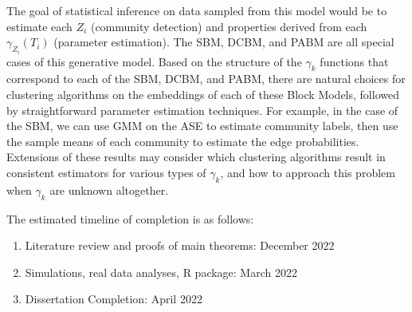 \documentclass[
  11pt,
]{article}
\begin{document}
The goal of statistical inference on data sampled from this model would
be to estimate each \(Z_i\) (community detection) and properties derived
from each \(\gamma_{Z_i}(T_i)\) (parameter estimation). The SBM, DCBM,
and PABM are all special cases of this generative model. Based on the
structure of the \(\gamma_k\) functions that correspond to each of the
SBM, DCBM, and PABM, there are natural choices for clustering algorithms
on the embeddings of each of these Block Models, followed by
straightforward parameter estimation techniques. For example, in the
case of the SBM, we can use GMM on the ASE to estimate community labels,
then use the sample means of each community to estimate the edge
probabilities. Extensions of these results may consider which clustering
algorithms result in consistent estimators for various types of
\(\gamma_k\), and how to approach this problem when \(\gamma_k\) are
unknown altogether.

The estimated timeline of completion is as follows:

\begin{enumerate}
\def\labelenumi{\arabic{enumi}.}
\item
  Literature review and proofs of main theorems: December 2022
\item
  Simulations, real data analyses, R package: March 2022
\item
  Dissertation Completion: April 2022
\end{enumerate}

  
\end{document}
